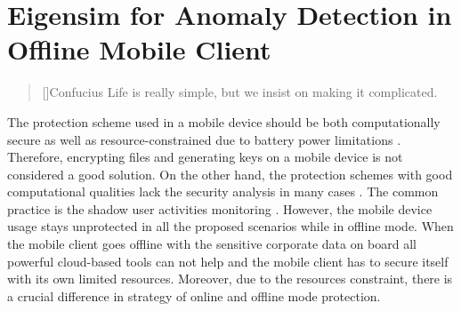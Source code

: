 \chapter{Eigensim for Anomaly Detection in Offline Mobile Client}
\label{ch:3_mobile}

\begin{quotation}[]{Confucius}
Life is really simple, but we insist on making it complicated.
\end{quotation}


The protection scheme used in a mobile device should be both computationally secure as well as resource-constrained due to battery power limitations \cite{khan2015cloud}. Therefore, encrypting files and generating keys on a mobile device is not considered a good solution. On the other hand, the protection schemes with good computational qualities lack the security analysis in many cases \cite{khan2014bss}. The common practice is the shadow user activities monitoring \cite{yovel2014}. However, the mobile device usage stays unprotected in all the proposed scenarios while in offline mode. When the mobile client goes offline with the sensitive corporate data on board all powerful cloud-based tools can not help and the mobile client has to secure itself with its own limited resources. Moreover, due to the resources constraint, there is a crucial difference in strategy of online and offline mode protection.

